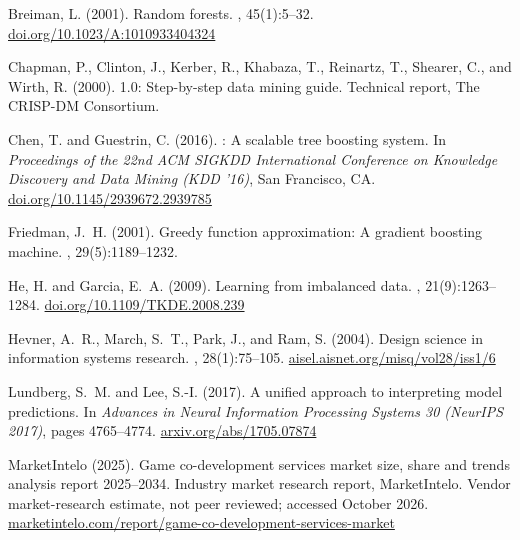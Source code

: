 \documentclass[12pt,oneside]{report}
\begin{document}
\begin{thebibliography}{}

Breiman, L. (2001).
\newblock Random forests.
, 45(1):5--32.
\newblock \href{https://doi.org/10.1023/A:1010933404324}{doi.org/10.1023/A:1010933404324}

Chapman, P., Clinton, J., Kerber, R., Khabaza, T., Reinartz, T., Shearer, C.,
  and Wirth, R. (2000).
 1.0: Step-by-step data mining guide.
\newblock Technical report, The CRISP-DM Consortium.

Chen, T. and Guestrin, C. (2016).
: A scalable tree boosting system.
\newblock In {\em Proceedings of the 22nd ACM SIGKDD International Conference
  on Knowledge Discovery and Data Mining (KDD '16)}, San Francisco, CA.
\newblock \href{https://doi.org/10.1145/2939672.2939785}{doi.org/10.1145/2939672.2939785}

Friedman, J.~H. (2001).
\newblock Greedy function approximation: A gradient boosting machine.
, 29(5):1189--1232.

He, H. and Garcia, E.~A. (2009).
\newblock Learning from imbalanced data.
,
  21(9):1263--1284.
\newblock \href{https://doi.org/10.1109/TKDE.2008.239}{doi.org/10.1109/TKDE.2008.239}

Hevner, A.~R., March, S.~T., Park, J., and Ram, S. (2004).
\newblock Design science in information systems research.
, 28(1):75--105.
\newblock \href{https://aisel.aisnet.org/misq/vol28/iss1/6/}{aisel.aisnet.org/misq/vol28/iss1/6}

Lundberg, S.~M. and Lee, S.-I. (2017).
\newblock A unified approach to interpreting model predictions.
\newblock In {\em Advances in Neural Information Processing Systems 30 (NeurIPS
  2017)}, pages 4765--4774.
\newblock \href{https://arxiv.org/abs/1705.07874}{arxiv.org/abs/1705.07874}

{MarketIntelo} (2025).
\newblock Game co-development services market size, share and trends analysis
  report 2025--2034.
\newblock Industry market research report, MarketIntelo. Vendor
  market-research estimate, not peer reviewed; accessed October 2026.
\newblock \href{https://marketintelo.com/report/game-co-development-services-market/}{marketintelo.com/report/game-co-development-services-market}


\end{thebibliography}
\end{document}
